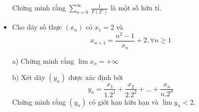 \documentclass[11pt]{scrartcl}
\begin{document}
\begin{itemize}[label=, leftmargin=0em, itemsep=-0em]
\begin{btvn}
    Chứng minh rằng $\displaystyle{\sum_{n=0}^{\infty}\,
        \frac{1}{F(2^n)}}$ là một số hữu tỉ.
    \end{btvn}

    \item \begin{btvn}
        Cho dãy số thực $(x_n)$ có $x_1 = 2$ và
        \[x_{n + 1} = \frac{n^2- 1}{x_n} + 2, \forall n \geq 1\]


        a) Chứng minh rằng $\lim x_n = +\infty$


        b) Xét dãy $(y_n)$ được xác định bởi
        \[y_n = \frac{x_1}{1.2^1} + \frac{x_2}{2.2^2} + \dots + \frac{x_n}{n.2^n}\]
        Chứng minh rằng $(y_n)$ có giới hạn hữu hạn và $\lim y_n < 2$.
        
    \end{btvn}

\end{itemize}
\end{document}
